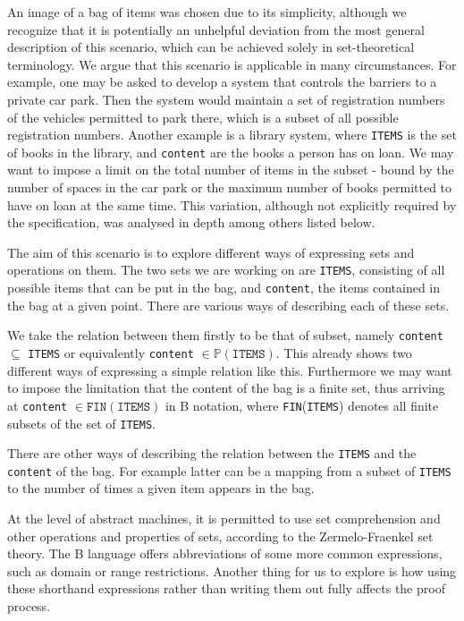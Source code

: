 \documentclass[11pt,journal]{IEEEtran}
\begin{document}
	An image of a bag of items was chosen due to its simplicity, although we recognize that it is potentially an unhelpful deviation from the most general description of this scenario, which can be achieved solely in set-theoretical terminology. We argue that this scenario is applicable in many circumstances. For example, one may be asked to develop a system that controls the barriers to a private car park. Then the system would maintain a set of registration numbers of the vehicles permitted to park there, which is a subset of all possible registration numbers. Another example is a library system, where \texttt{ITEMS} is the set of books in the library, and \texttt{content} are the books a person has on loan. We may want to impose a limit on the total number of items in the subset - bound by the number of spaces in the car park or the maximum number of books permitted to have on loan at the same time. This variation, although not explicitly required by the specification, was analysed in depth among others listed below.
	
	The aim of this scenario is to explore different ways of expressing sets and operations on them. The two sets we are working on are \texttt{ITEMS}, consisting of all possible items that can be put in the bag, and \texttt{content}, the items contained in the bag at a given point. There are various ways of describing each of these sets. 
	
	We take the relation between them firstly to be that of subset, namely \texttt{content} $\subseteq$ \texttt{ITEMS} or equivalently \texttt{content} $\in \mathbb{P}(\texttt{ITEMS})$. This already shows two different ways of expressing a simple relation like this. Furthermore we may want to impose the limitation that the content of the bag is a finite set, thus arriving at \texttt{content} $\in \texttt{FIN}(\texttt{ITEMS})$ in B notation, where \texttt{FIN}(\texttt{ITEMS}) denotes all finite subsets of the set of \texttt{ITEMS}. 
	
	There are other ways of describing the relation between the \texttt{ITEMS} and the \texttt{content} of the bag. For example latter can be a mapping from a subset of \texttt{ITEMS} to the number of times a given item appears in the bag.
	
	At the level of abstract machines, it is permitted to use set comprehension and other operations and properties of sets, according to the Zermelo-Fraenkel set theory. The B language offers abbreviations of some more common expressions, such as domain or range restrictions. Another thing for us to explore is how using these shorthand expressions rather than writing them out fully affects the proof process.
\end{document}
